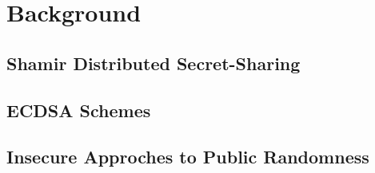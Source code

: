 \section{Background}

\subsection{Shamir Distributed Secret-Sharing}

\subsection{ECDSA Schemes}

\subsection{Insecure Approches to Public Randomness}

